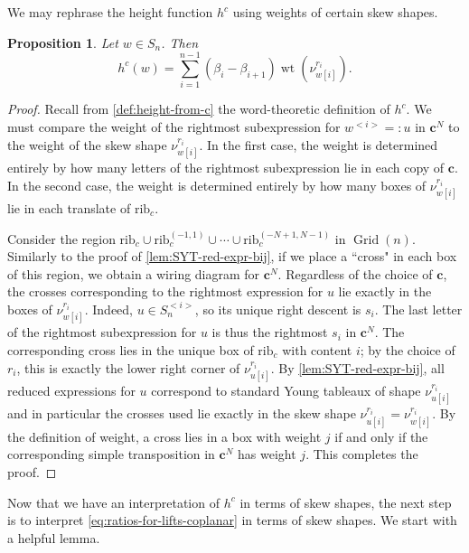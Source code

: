 \documentclass[11pt]{amsart}
\newtheorem{proposition}[Thm]{Proposition}
\theoremstyle{definition}
\DeclareMathOperator{\wt}{wt}
\DeclareMathOperator{\Grid}{Grid}
\def\hgt{h}
\def\pbolic^#1{^{<#1>}}
\def\bc{\mathbf{c}}
\def\hc{\hgt^c}
\def\rib_#1{\mathrm{rib}_{#1}}
\def\grid_#1{\Grid(#1)}
\def\skew{\nu}
\def\pt{\beta}
\begin{document}
We may rephrase the height function $\hc$ using weights of certain skew shapes.

\begin{proposition}\label{prop:lattice-path-wt-def}
	Let $w \in S_n$. Then 
	\[\hc(w)= \sum_{i=1}^{n-1} (\pt_i - \pt_{i+1}) \wt \left(\skew_{w[i]}^{r_i}\right).\] 
\end{proposition}
\begin{proof}
	Recall from \cref{def:height-from-c} the word-theoretic definition of $\hc$. We must compare the weight of the rightmost subexpression for $w\pbolic^{i}=:u$ in $\bc^N$ to the weight of the skew shape $\skew_{w[i]}^{r_i}$. In the first case, the weight is determined entirely by how many letters of the rightmost subexpression lie in each copy of $\bc$. In the second case, the weight is determined entirely by how many boxes of $\skew_{w[i]}^{r_i}$ lie in each translate of $\rib_c$. 
	
	Consider the region $\rib_c \cup \rib_c^{(-1,1)} \cup \cdots \cup \rib_c^{(-N+1, N-1)}$ in $\grid_n$. Similarly to the proof of \cref{lem:SYT-red-expr-bij}, if we place a ``cross" in each box of this region, we obtain a wiring diagram for $\bc^N$. Regardless of the choice of $\bc$, the crosses corresponding to the rightmost expression for $u$ lie exactly in the boxes of $\skew_{w[i]}^{r_i}$. Indeed, $u \in S_n\pbolic^{i}$, so its unique right descent is $s_i$. The last letter of the rightmost subexpression for $u$ is thus the rightmost $s_i$ in $\bc^N$. The corresponding cross lies in the unique box of $\rib_c$ with content $i$; by the choice of $r_i$, this is exactly the lower right corner of $\skew_{u[i]}^{r_i}$. By \cref{lem:SYT-red-expr-bij}, all reduced expressions for $u$ correspond to standard Young tableaux of shape $\skew_{u[i]}^{r_i}$ and in particular the crosses used lie exactly in the skew shape $\skew_{u[i]}^{r_i}=\skew_{w[i]}^{r_i}$. By the definition of weight, a cross lies in a box with weight $j$ if and only if the corresponding simple transposition in $\bc^N$ has weight $j$. This completes the proof.
\end{proof}

Now that we have an interpretation of $\hc$ in terms of skew shapes, the next step is to interpret \eqref{eq:ratios-for-lifts-coplanar} in terms of skew shapes. We start with a helpful lemma.
\end{document}
